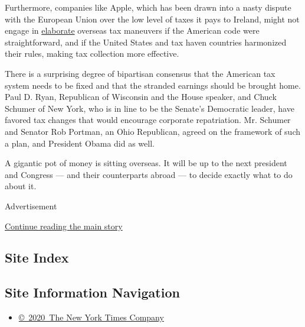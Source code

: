 Furthermore, companies like Apple, which has been drawn into a nasty
dispute with the European Union over the low level of taxes it pays to
Ireland, might not engage in
\href{http://www.nytimes.com/2012/04/29/business/apples-tax-strategy-aims-at-low-tax-states-and-nations.html}{elaborate}
overseas tax maneuvers if the American code were straightforward, and if
the United States and tax haven countries harmonized their rules, making
tax collection more effective.

There is a surprising degree of bipartisan consensus that the American
tax system needs to be fixed and that the stranded earnings should be
brought home. Paul D. Ryan, Republican of Wisconsin and the House
speaker, and Chuck Schumer of New York, who is in line to be the
Senate's Democratic leader, have favored tax changes that would
encourage corporate repatriation. Mr. Schumer and Senator Rob Portman,
an Ohio Republican, agreed on the framework of such a plan, and
President Obama did as well.

A gigantic pot of money is sitting overseas. It will be up to the next
president and Congress --- and their counterparts abroad --- to decide
exactly what to do about it.

Advertisement

\protect\hyperlink{after-bottom}{Continue reading the main story}

\hypertarget{site-index}{%
\subsection{Site Index}\label{site-index}}

\hypertarget{site-information-navigation}{%
\subsection{Site Information
Navigation}\label{site-information-navigation}}

\begin{itemize}
\tightlist
\item
  \href{https://help.nytimes.com/hc/en-us/articles/115014792127-Copyright-notice}{©~2020~The
  New York Times Company}
\end{itemize}

